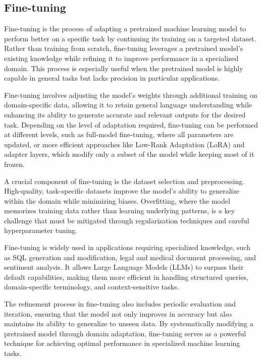     \subsection{Fine-tuning}
    Fine-tuning is the process of adapting a pretrained machine learning model to perform better on a specific task by continuing its training on a targeted dataset. Rather than training from scratch, fine-tuning leverages a pretrained model’s existing knowledge while refining it to improve performance in a specialized domain. This process is especially useful when the pretrained model is highly capable in general tasks but lacks precision in particular applications.

    Fine-tuning involves adjusting the model's weights through additional training on domain-specific data, allowing it to retain general language understanding while enhancing its ability to generate accurate and relevant outputs for the desired task. Depending on the level of adaptation required, fine-tuning can be performed at different levels, such as full-model fine-tuning, where all parameters are updated, or more efficient approaches like Low-Rank Adaptation (LoRA) and adapter layers, which modify only a subset of the model while keeping most of it frozen.

    A crucial component of fine-tuning is the dataset selection and preprocessing. High-quality, task-specific datasets improve the model’s ability to generalize within the domain while minimizing biases. Overfitting, where the model memorizes training data rather than learning underlying patterns, is a key challenge that must be mitigated through regularization techniques and careful hyperparameter tuning.

    Fine-tuning is widely used in applications requiring specialized knowledge, such as SQL generation and modification, legal and medical document processing, and sentiment analysis. It allows Large Language Models (LLMs) to surpass their default capabilities, making them more efficient in handling structured queries, domain-specific terminology, and context-sensitive tasks.

    The refinement process in fine-tuning also includes periodic evaluation and iteration, ensuring that the model not only improves in accuracy but also maintains its ability to generalize to unseen data. By systematically modifying a pretrained model through domain adaptation, fine-tuning serves as a powerful technique for achieving optimal performance in specialized machine learning tasks.
    \cite{levcraigfinetuning}

